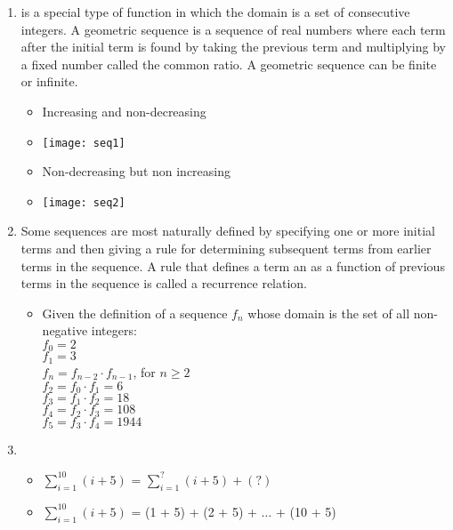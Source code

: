 \documentclass[12pt,a4paper]{article}
\begin{document}
\begin{center}
  \large\textsc{}
\end{center}
\begin{enumerate}
  \item {} is a special type of function in which the domain is a set of consecutive integers.
  A geometric sequence is a sequence of real numbers where each term after the initial term is found by taking the previous term and multiplying by a fixed number called the common ratio. A geometric sequence can be finite or infinite.
  \begin{itemize}
    \item Increasing and non-decreasing
    \item[] \texttt{[image: seq1]}
    \item Non-decreasing but non increasing
    \item[] \texttt{[image: seq2]}
  \end{itemize}
  \item {} Some sequences are most naturally defined by specifying one or more initial terms and then giving a rule for determining subsequent terms from earlier terms in the sequence. A rule that defines a term an as a function of previous terms in the sequence is called a recurrence relation.
  \begin{itemize}
    \item Given the definition of a sequence \(f_{n}\) whose domain is the set of all non-negative integers:\\
    \(f_{0} = 2\) \\
    \(f_{1} = 3\) \\
    \(f_{n} = f_{n-2} \cdot f_{n-1}\), for \(n \geq 2\) \\
    \(f_{2} = f_{0} \cdot f_{1} = 6\) \\
    \(f_{3} = f_{1} \cdot f_{2} = 18\) \\ 
    \(f_{4} = f_{2} \cdot f_{3} = 108\) \\
    \(f_{5} = f_{3} \cdot f_{4} = 1944\)
  \end{itemize}
  \item {}
  \begin{itemize}
    \item[] \(\displaystyle\sum_{i = 1}^{10} (i + 5) \) = \(\displaystyle\sum_{i = 1}^{?} (i + 5) + (?) \)
    \item[] \(\displaystyle\sum_{i = 1}^{10} (i + 5) \) = (1 + 5) + (2 + 5) + \(\ldots \) + (10 + 5)

\end{itemize}
\end{enumerate}
\end{document}
